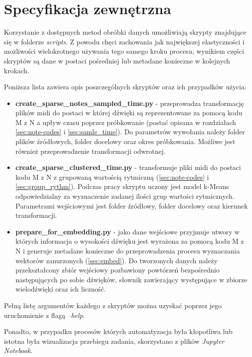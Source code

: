 {    \section{Specyfikacja zewnętrzna}
    {
        Korzystanie z dostępnych metod obróbki danych umożliwiają skrypty znajdujące się w folderze {\textit {{scripts}}}. Z powodu chęci zachowania jak największej elastyczności i możliwości wielokrotnego używania tego samego kroku procesu, wynikiem części skryptów są dane w postaci pośredniej lub metadane konieczne w kolejnych krokach.

        Poniższa lista zawiera opis poszczególnych skryptów oraz ich przypadków użycia:
        \begin{itemize}
            \setlength\itemsep{-0.5em}
            \item {\textbf {create\_sparse\_notes\_sampled\_time.py}} - przeprowadza transformację plików midi do postaci w której dźwięki są reprezentowane za pomocą kodu M\,\,z\,\,N a upływ czasu poprzez próbkowanie (postać opisana w rozdziałach \ref{sec:note-codes} i \ref{sec:samle_time}). Do parametrów wywołania należy folder plików źródłowych, folder docelowy oraz okres próbkowania. Możliwe jest również przeprowadzenie transformacji odwrotnej.
            \item {\textbf {create\_sparse\_clustered\_time.py}} - transformuje pliki midi do postaci kodu M\,\,z\,\,N z grupowaną wartością rytmiczną (\ref{sec:note-codes} i \ref{sec:group_rythm}). Podczas pracy skryptu uczony jest model k-Means odpowiedzialny za wyznaczenie zadanej ilości grup wartości rytmicznych. Parametrami wejściowymi jest folder źródłowy, folder docelowy oraz kierunek transformacji.
            \item {\textbf {prepare\_for\_embedding.py}} - jako dane wejściowe przyjmuje utwory w których informacja o wysokości dźwięku jest wyrażona za pomocą kodu M\,\,z\,\,N i generuje metadane konieczne do przeprowadzenia procesu wyznaczania wektorów zanurzonych (\ref{sec:embed}). Do tworzonych danych należy przekształcony zbiór wejściowy pozbawiony powtórzeń bezpośrednio następujących po sobie dźwięków, słownik zawierający występujące w zbiorze wielodźwięki oraz ich liczność. 
        \end{itemize} 

        Pełną listę argumentów każdego z skryptów można uzyskać poprzez jego uruchomienie z flagą {\textit {--help}}.

        Ponadto, w przypadku procesów których automatyzacja była kłopotliwa lub istotna była wizualizacja przebiegu zadania, skorzystano z plików {\textit {Jupyter Notebook}}.

}}
